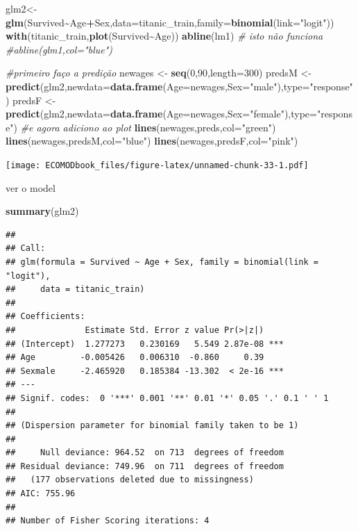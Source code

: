 \documentclass[
]{book}
\newenvironment{Shaded}{\begin{snugshade}}{\end{snugshade}}
\newcommand{\AttributeTok}[1]{\textcolor[rgb]{0.13,0.29,0.53}{#1}}
\newcommand{\CommentTok}[1]{\textcolor[rgb]{0.56,0.35,0.01}{\textit{#1}}}
\newcommand{\DecValTok}[1]{\textcolor[rgb]{0.00,0.00,0.81}{#1}}
\newcommand{\FunctionTok}[1]{\textcolor[rgb]{0.13,0.29,0.53}{\textbf{#1}}}
\newcommand{\NormalTok}[1]{#1}
\newcommand{\OtherTok}[1]{\textcolor[rgb]{0.56,0.35,0.01}{#1}}
\newcommand{\SpecialCharTok}[1]{\textcolor[rgb]{0.81,0.36,0.00}{\textbf{#1}}}
\newcommand{\StringTok}[1]{\textcolor[rgb]{0.31,0.60,0.02}{#1}}
\begin{document}
\begin{Shaded}
\begin{Highlighting}[]
\NormalTok{glm2}\OtherTok{\textless{}{-}}\FunctionTok{glm}\NormalTok{(Survived}\SpecialCharTok{\textasciitilde{}}\NormalTok{Age}\SpecialCharTok{+}\NormalTok{Sex,}\AttributeTok{data=}\NormalTok{titanic\_train,}\AttributeTok{family=}\FunctionTok{binomial}\NormalTok{(}\AttributeTok{link=}\StringTok{"logit"}\NormalTok{))}
\FunctionTok{with}\NormalTok{(titanic\_train,}\FunctionTok{plot}\NormalTok{(Survived}\SpecialCharTok{\textasciitilde{}}\NormalTok{Age))}
\FunctionTok{abline}\NormalTok{(lm1)}
\CommentTok{\# isto não funciona}
\CommentTok{\#abline(glm1,col="blue")}

\CommentTok{\#primeiro faço a predição}
\NormalTok{newages }\OtherTok{\textless{}{-}} \FunctionTok{seq}\NormalTok{(}\DecValTok{0}\NormalTok{,}\DecValTok{90}\NormalTok{,}\AttributeTok{length=}\DecValTok{300}\NormalTok{)}
\NormalTok{predsM }\OtherTok{\textless{}{-}} \FunctionTok{predict}\NormalTok{(glm2,}\AttributeTok{newdata=}\FunctionTok{data.frame}\NormalTok{(}\AttributeTok{Age=}\NormalTok{newages,}\AttributeTok{Sex=}\StringTok{"male"}\NormalTok{),}\AttributeTok{type=}\StringTok{"response"}\NormalTok{)}
\NormalTok{predsF }\OtherTok{\textless{}{-}} \FunctionTok{predict}\NormalTok{(glm2,}\AttributeTok{newdata=}\FunctionTok{data.frame}\NormalTok{(}\AttributeTok{Age=}\NormalTok{newages,}\AttributeTok{Sex=}\StringTok{"female"}\NormalTok{),}\AttributeTok{type=}\StringTok{"response"}\NormalTok{)}
\CommentTok{\#e agora adiciono ao plot}
\FunctionTok{lines}\NormalTok{(newages,preds,}\AttributeTok{col=}\StringTok{"green"}\NormalTok{)}
\FunctionTok{lines}\NormalTok{(newages,predsM,}\AttributeTok{col=}\StringTok{"blue"}\NormalTok{)}
\FunctionTok{lines}\NormalTok{(newages,predsF,}\AttributeTok{col=}\StringTok{"pink"}\NormalTok{)}
\end{Highlighting}
\end{Shaded}

\texttt{[image: ECOMODbook\_files/figure-latex/unnamed-chunk-33-1.pdf]}

ver o model

\begin{Shaded}
\begin{Highlighting}[]
\FunctionTok{summary}\NormalTok{(glm2)}
\end{Highlighting}
\end{Shaded}

\begin{verbatim}
## 
## Call:
## glm(formula = Survived ~ Age + Sex, family = binomial(link = "logit"), 
##     data = titanic_train)
## 
## Coefficients:
##              Estimate Std. Error z value Pr(>|z|)    
## (Intercept)  1.277273   0.230169   5.549 2.87e-08 ***
## Age         -0.005426   0.006310  -0.860     0.39    
## Sexmale     -2.465920   0.185384 -13.302  < 2e-16 ***
## ---
## Signif. codes:  0 '***' 0.001 '**' 0.01 '*' 0.05 '.' 0.1 ' ' 1
## 
## (Dispersion parameter for binomial family taken to be 1)
## 
##     Null deviance: 964.52  on 713  degrees of freedom
## Residual deviance: 749.96  on 711  degrees of freedom
##   (177 observations deleted due to missingness)
## AIC: 755.96
## 
## Number of Fisher Scoring iterations: 4
\end{verbatim}
\end{document}
